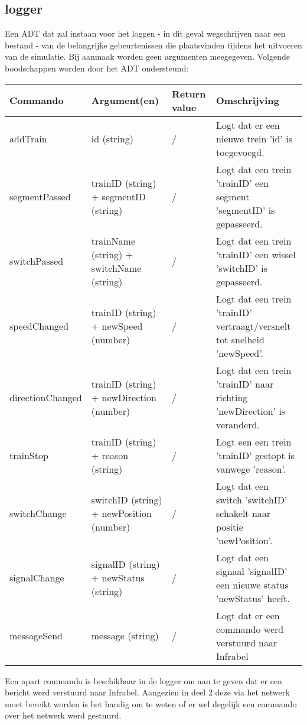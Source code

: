 \documentclass{article}
\begin{document}
\subsection{logger} %
Een ADT dat zal instaan voor het loggen - in dit geval wegschrijven naar een bestand - van de belangrijke gebeurtenissen die plaatsvinden tijdens het uitvoeren van de simulatie. Bij aanmaak worden geen argumenten meegegeven.
Volgende boodschappen worden door het ADT ondersteund:
\begin{center}
    \begin{tabular}{ | l | p{3.5cm} | l | p{8cm} |}
    \hline
    Commando & Argument(en) & Return value & Omschrijving \\ \hline
    addTrain & id (string) & / & Logt dat er een nieuwe trein 'id' is toegevoegd. \\ \hline
    segmentPassed & trainID (string) + segmentID (string) & / & Logt dat een trein 'trainID' een segment 'segmentID' is gepasseerd. \\ \hline
    switchPassed & trainName (string) + switchName (string) & / & Logt dat een trein 'trainID' een wissel 'switchID' is gepasseerd. \\ \hline
    speedChanged & trainID (string) + newSpeed (number) & / & Logt dat een trein 'trainID' vertraagt/versnelt tot snelheid 'newSpeed'. \\ \hline
    directionChanged & trainID (string) + newDirection (number) & / & Logt dat een trein 'trainID' naar richting 'newDirection' is veranderd. \\ \hline
    trainStop & trainID (string) + reason (string) & / & Logt een een trein 'trainID' gestopt is vanwege 'reason'. \\ \hline
    switchChange & switchID (string) + newPosition (number) & / & Logt dat een switch 'switchID' schakelt naar positie 'newPosition'. \\ \hline
    signalChange & signalID (string) + newStatus (string) & / & Logt dat een signaal 'signalID' een nieuwe status 'newStatus' heeft. \\ \hline
    messageSend & message (string) & / & Logt dat er een commando werd verstuurd naar Infrabel \\ \hline
    \end{tabular}
\end{center}

Een apart commando is beschikbaar in de logger om aan te geven dat er een bericht werd verstuurd naar Infrabel. Aangezien in deel 2 deze via het netwerk moet bereikt worden is het handig om te weten of er wel degelijk een commando over het netwerk werd gestuurd.
\end{document}

